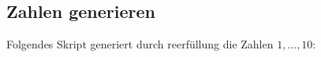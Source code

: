 




\subsection{Zahlen generieren}
Folgendes Skript generiert durch reerfüllung die Zahlen $1, \dots, 10$:

